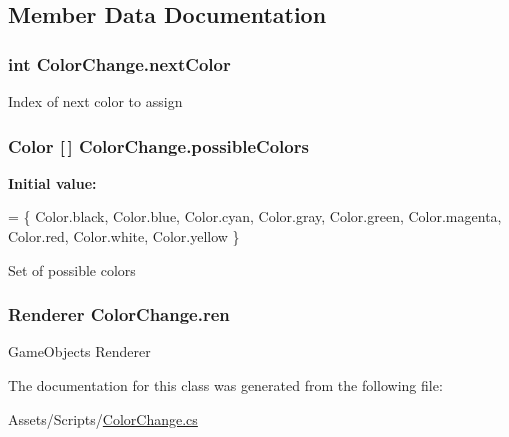 \subsection{Member Data Documentation}
\hypertarget{class_color_change_a24d6e49ea48325fb5fb722bb80264339}{}
\subsubsection[{next\+Color}]{\setlength{\rightskip}{0pt plus 5cm}int Color\+Change.\+next\+Color}\label{class_color_change_a24d6e49ea48325fb5fb722bb80264339}
Index of next color to assign \hypertarget{class_color_change_a82d62c6de3e5c99613d876af2de00627}{}
\subsubsection[{possible\+Colors}]{\setlength{\rightskip}{0pt plus 5cm}Color \mbox{[}$\,$\mbox{]} Color\+Change.\+possible\+Colors}\label{class_color_change_a82d62c6de3e5c99613d876af2de00627}
{\bfseries Initial value\+:}
\begin{DoxyCode}
= \{
        Color.black,
        Color.blue,
        Color.cyan,
        Color.gray,
        Color.green,
        Color.magenta,
        Color.red,
        Color.white,
        Color.yellow
    \}
\end{DoxyCode}
Set of possible colors \hypertarget{class_color_change_a325e912ee57c39a0fa9187988dac05de}{}
\subsubsection[{ren}]{\setlength{\rightskip}{0pt plus 5cm}Renderer Color\+Change.\+ren}\label{class_color_change_a325e912ee57c39a0fa9187988dac05de}
Game\+Object\textquotesingle{}s Renderer 

The documentation for this class was generated from the following file\+:\begin{DoxyCompactItemize}
\item 
Assets/\+Scripts/\hyperlink{_color_change_8cs}{Color\+Change.\+cs}\end{DoxyCompactItemize}
